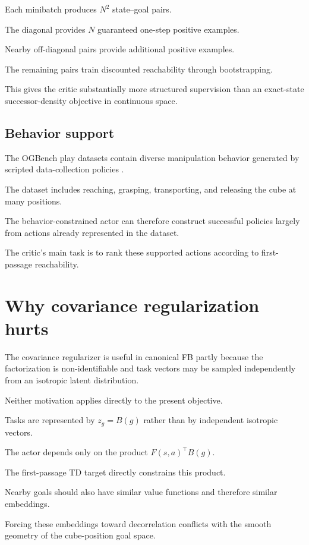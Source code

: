 \documentclass[11pt]{article}
\theoremstyle{remark}
\begin{document}
Each minibatch produces $N^2$ state--goal pairs.

The diagonal provides $N$ guaranteed one-step positive examples.

Nearby off-diagonal pairs provide additional positive examples.

The remaining pairs train discounted reachability through bootstrapping.

This gives the critic substantially more structured supervision than an exact-state successor-density objective in continuous space.

\subsection{Behavior support}

The OGBench play datasets contain diverse manipulation behavior generated by scripted data-collection policies \citep{park2025ogbench}.

The dataset includes reaching, grasping, transporting, and releasing the cube at many positions.

The behavior-constrained actor can therefore construct successful policies largely from actions already represented in the dataset.

The critic's main task is to rank these supported actions according to first-passage reachability.

\section{Why covariance regularization hurts}

The covariance regularizer is useful in canonical FB partly because the factorization is non-identifiable and task vectors may be sampled independently from an isotropic latent distribution.

Neither motivation applies directly to the present objective.

Tasks are represented by $z_g=B(g)$ rather than by independent isotropic vectors.

The actor depends only on the product $F(s,a)^\top B(g)$.

The first-passage TD target directly constrains this product.

Nearby goals should also have similar value functions and therefore similar embeddings.

Forcing these embeddings toward decorrelation conflicts with the smooth geometry of the cube-position goal space.
\end{document}
